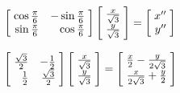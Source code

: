 \documentclass[a4paper]{article}
\begin{document}
\begin{enumerate}[label=\textbf{\arabic*.}]
\begin{enumerate}
		\begin{equation*}
		\begin{bmatrix*}[r]
			\hspace{1mm} \cos{\frac{\pi}{6}} & -\sin{\frac{\pi}{6}} \hspace{1mm}\\
			\hspace{1mm} \sin{\frac{\pi}{6}} & \cos{\frac{\pi}{6}} \hspace{1mm}\\
		\end{bmatrix*}
		\begin{bmatrix*}[r]
			\hspace{1mm} \frac{x}{\sqrt{3}} \hspace{1mm}\\
			\hspace{1mm} \frac{y}{\sqrt{3}} \hspace{1mm}\\
		\end{bmatrix*}
		=
		\begin{bmatrix*}[r]
			\hspace{1mm} x^{\prime \prime} \hspace{1mm}\\
			\hspace{1mm} y^{\prime \prime} \hspace{1mm}\\
		\end{bmatrix*}
		\end{equation*}

		\begin{equation*}
		\begin{bmatrix*}[r]
			\hspace{1mm} \frac{\sqrt{3}}{2} & -\frac{1}{2} \hspace{1mm}\\
			\hspace{1mm} \frac{1}{2} & \frac{\sqrt{3}}{2} \hspace{1mm}\\
		\end{bmatrix*}
		\begin{bmatrix*}[r]
			\hspace{1mm} \frac{x}{\sqrt{3}} \hspace{1mm}\\
			\hspace{1mm} \frac{y}{\sqrt{3}} \hspace{1mm}\\
		\end{bmatrix*}
		=
		\begin{bmatrix*}[r]
			\hspace{1mm} \frac{x}{2} - \frac{y}{2\sqrt{3}} \hspace{1mm}\\
			\hspace{1mm} \frac{x}{2\sqrt{3}} + \frac{y}{2} \hspace{1mm}\\
		\end{bmatrix*}
		\end{equation*}


\end{enumerate}
\end{enumerate}
\end{document}
